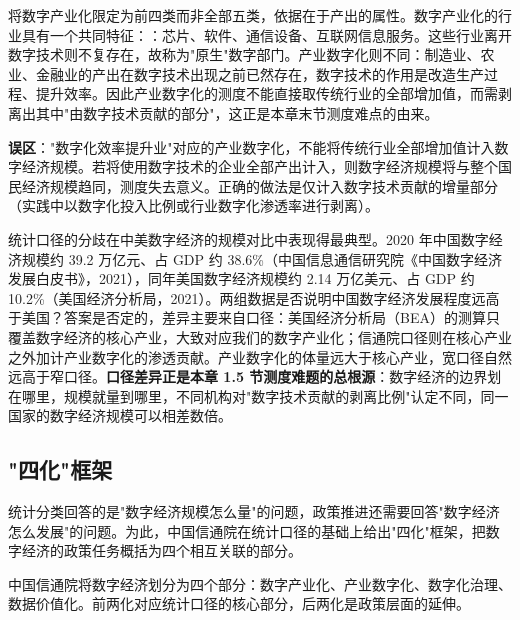 将数字产业化限定为前四类而非全部五类，依据在于产出的属性。数字产业化的行业具有一个共同特征：：芯片、软件、通信设备、互联网信息服务。这些行业离开数字技术则不复存在，故称为"原生"数字部门。产业数字化则不同：制造业、农业、金融业的产出在数字技术出现之前已然存在，数字技术的作用是改造生产过程、提升效率。因此产业数字化的测度不能直接取传统行业的全部增加值，而需剥离出其中"由数字技术贡献的部分"，这正是本章末节测度难点的由来。

\begin{misconception}
\textbf{误区}："数字化效率提升业"对应的产业数字化，不能将传统行业全部增加值计入数字经济规模。若将使用数字技术的企业全部产出计入，则数字经济规模将与整个国民经济规模趋同，测度失去意义。正确的做法是仅计入数字技术贡献的增量部分（实践中以数字化投入比例或行业数字化渗透率进行剥离）。
\end{misconception}

统计口径的分歧在中美数字经济的规模对比中表现得最典型。2020 年中国数字经济规模约 39.2 万亿元、占 GDP 约 38.6\%（中国信息通信研究院《中国数字经济发展白皮书》，2021），同年美国数字经济规模约 2.14 万亿美元、占 GDP 约 10.2\%（美国经济分析局，2021）。两组数据是否说明中国数字经济发展程度远高于美国？答案是否定的，差异主要来自口径：美国经济分析局（BEA）的测算只覆盖数字经济的核心产业，大致对应我们的数字产业化；信通院口径则在核心产业之外加计产业数字化的渗透贡献。产业数字化的体量远大于核心产业，宽口径自然远高于窄口径。\textbf{口径差异正是本章 1.5 节测度难题的总根源}：数字经济的边界划在哪里，规模就量到哪里，不同机构对"数字技术贡献的剥离比例"认定不同，同一国家的数字经济规模可以相差数倍。

\subsection{"四化"框架}

统计分类回答的是"数字经济规模怎么量"的问题，政策推进还需要回答"数字经济怎么发展"的问题。为此，中国信通院在统计口径的基础上给出"四化"框架，把数字经济的政策任务概括为四个相互关联的部分。

\begin{definition}
中国信通院将数字经济划分为四个部分：数字产业化、产业数字化、数字化治理、数据价值化。前两化对应统计口径的核心部分，后两化是政策层面的延伸。
\end{definition}


